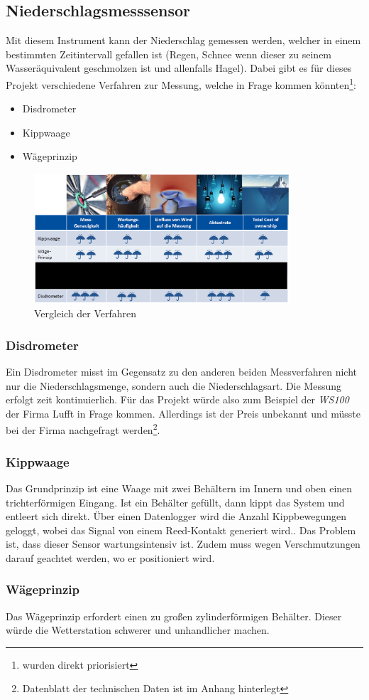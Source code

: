 \subsection{Niederschlagsmesssensor}
Mit diesem Instrument kann der Niederschlag gemessen werden, welcher in einem bestimmten Zeitintervall gefallen ist (Regen, Schnee wenn dieser zu seinem Wasseräquivalent geschmolzen ist und allenfalls Hagel). Dabei gibt es für dieses Projekt verschiedene Verfahren zur Messung, welche in Frage kommen könnten\footnote{wurden direkt priorisiert}:
\begin{itemize}
\item[1.] Disdrometer
\item[2.] Kippwaage
\item[3.] Wägeprinzip
\end{itemize}
\begin{figure}[hbtp]
\centering
\includegraphics[width=0.85\textwidth]{graphics/vergleich_verfahren.PNG}
\caption{Vergleich der Verfahren}
\label{vergleich_der_verfahren}
\end{figure}

\subsubsection{Disdrometer}
Ein Disdrometer misst im Gegensatz zu den anderen beiden Messverfahren nicht nur die Niederschlagsmenge, sondern auch die Niederschlagsart. Die Messung erfolgt zeit kontinuierlich. Für das Projekt würde also zum Beispiel der \textit{WS100} der Firma Lufft in Frage kommen. Allerdings ist der Preis unbekannt und müsste bei der Firma nachgefragt werden\footnote{Datenblatt der technischen Daten ist im Anhang hinterlegt}.

\subsubsection{Kippwaage}
Das Grundprinzip ist eine Waage mit zwei Behältern im Innern und oben einen trichterförmigen Eingang. Ist ein Behälter gefüllt, dann kippt das System und entleert sich direkt. Über einen Datenlogger wird die Anzahl Kippbewegungen geloggt, wobei das Signal von einem Reed-Kontakt generiert wird.. Das Problem ist, dass dieser Sensor wartungsintensiv ist. Zudem muss wegen Verschmutzungen darauf geachtet werden, wo er positioniert wird.

\subsubsection{Wägeprinzip}
Das Wägeprinzip erfordert einen zu großen zylinderförmigen Behälter. Dieser würde die Wetterstation schwerer und unhandlicher machen.